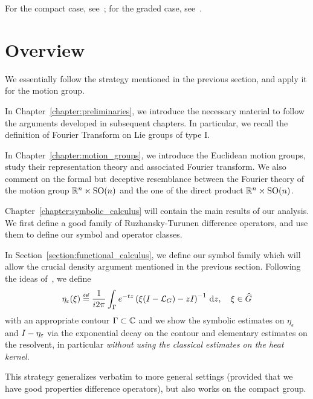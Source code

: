 For the compact case,
see~\cite[Sections 6.3 and 7.3]{Fischer2015};
for the graded case,
see~\cite[Sections 5.4 and 5.5]{FischerRuzhansky16}.

\section{Overview}

We essentially follow the strategy mentioned in the previous section,
and apply it for the motion group.

In Chapter~\ref{chapter:preliminaries},
we introduce the necessary material to follow the arguments developed in subsequent chapters.
In particular, we recall the definition of Fourier Transform on Lie groups of type I.

In Chapter~\ref{chapter:motion_groups},
we introduce the Euclidean motion groups,
study their representation theory and associated Fourier transform.
We also comment on the formal but deceptive resemblance between the Fourier theory of the motion group $\mathbb{R}^n \ltimes {\mathrm{SO} (n)}$
and the one of the direct product $\mathbb{R}^n \times {\mathrm{SO} (n)}$.

Chapter~\ref{chapter:symbolic_calculus} will contain the main results of our analysis.
We first define a good family of Ruzhansky-Turunen difference operators,
and use them to define our symbol and operator classes.

In Section~\ref{section:functional_calculus},
we define our symbol family which will allow the crucial density argument mentioned in the previous section.
Following the ideas of~\cite{Shubin01, RuzhanskyWirth14},
we define
\begin{align*}
    \eta_\epsilon(\xi) \defeq
    \frac 1 {\i \turn} \int_\Gamma \e^{-t z} \left(\xi(\Id {} - \Laplacian) - z \Id {}\right)^{-1} \dd z,
    \quad \xi \in \dualGroup \Group
\end{align*}
with an appropriate contour $\Gamma \subset \mathbb{C}$
and we show the symbolic estimates on $\eta_\epsilon$ and ${I_{}} - \eta_\varepsilon$
via the exponential decay on the contour and elementary estimates on the resolvent,
in particular \emph{without using the classical estimates on the heat kernel}.

This strategy generalizes verbatim to more general settings
(provided that we have good properties difference operators),
but also works on the compact group.

